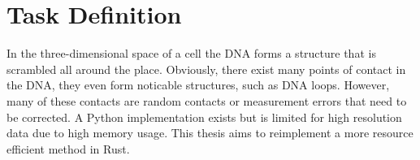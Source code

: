 %
%
%
%
%
%



\section{Task Definition}\label{sec:task}



In the three-dimensional space of a cell the DNA forms a structure that is
scrambled all around the place. Obviously, there exist many points of contact
in the DNA, they even form noticable structures, such as DNA loops. However,
many of these contacts are random contacts or measurement errors that need to
be corrected. A Python implementation exists but is limited for high resolution
data due to high memory usage. This thesis aims to reimplement a more resource
efficient method in Rust.

